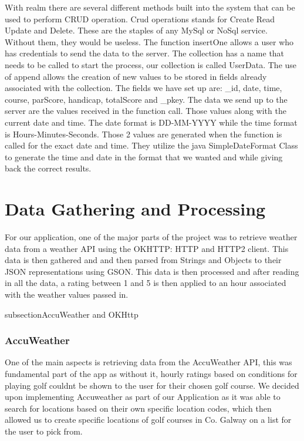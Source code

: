 With realm there are several different methods built into the system that can be used to perform CRUD operation. Crud operations stands for Create Read Update and Delete. These are the staples of any MySql or NoSql service. Without them, they would be useless. The function insertOne allows a user who has credentials to send the data to the server.
\newline
The collection has a name that needs to be called to start the process, our collection is called UserData. The use of append allows the creation of new values to be stored in fields already associated with the collection. The fields we have set up are: \_id, date, time, course, parScore, handicap, totalScore and \_pkey. The data we send up to the server are the values received in the function call. Those values along with the current date and time. The date format is DD-MM-YYYY while the time format is Hours-Minutes-Seconds. Those 2 values are generated when the function is called for the exact date and time. They utilize the java SimpleDateFormat Class to generate the time and date in the format that we wanted and while giving back the correct results.
\section{Data Gathering and Processing}
For our application, one of the major parts of the project was to retrieve weather data from a weather API using the OKHTTP: HTTP and HTTP2 client. This data is then gathered and and then parsed from Strings and Objects to their JSON representations using GSON. This data is then processed and after reading in all the data, a rating between 1 and 5 is then applied to an hour associated with the weather values passed in.

subsection{AccuWeather and OKHttp}
\subsubsection{AccuWeather}
One of the main aspects is retrieving data from the AccuWeather API, this was fundamental part of the app as without it, hourly ratings based on conditions for playing golf couldnt be shown to the user for their chosen golf course. We decided upon implementing Accuweather as part of our Application as it was able to search for locations based on their own specific location codes, which then allowed us to create specific locations of golf courses in Co. Galway on a list for the user to pick from.

